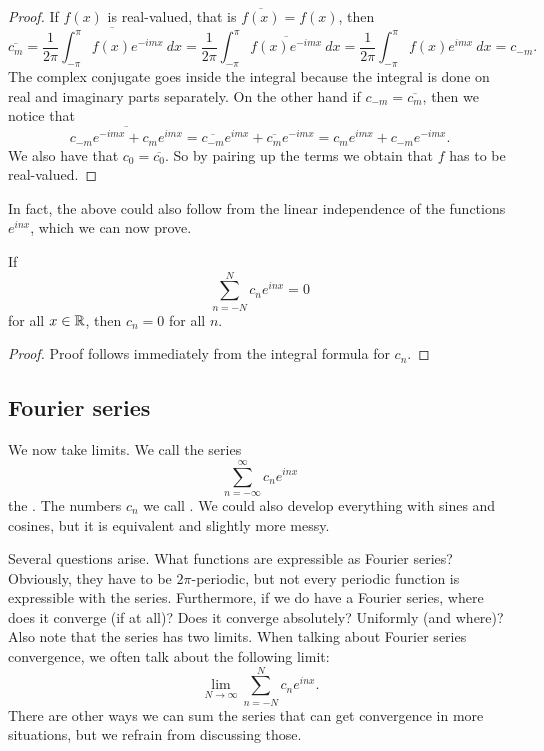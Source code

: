 \begin{proof}
If $f(x)$ is real-valued, that is $\overline{f(x)} = f(x)$, then
\begin{equation*}
\overline{c_m}
=
\overline{
\frac{1}{2\pi} \int_{-\pi}^\pi
f(x) e^{-imx} ~ dx
}
=
\frac{1}{2\pi} \int_{-\pi}^\pi
\overline{
f(x) e^{-imx} } ~ dx
=
\frac{1}{2\pi} \int_{-\pi}^\pi
f(x) e^{imx} ~ dx
= c_{-m} .
\end{equation*}
The complex conjugate goes inside the integral because the integral is
done on real and imaginary parts separately.  On the other hand if 
$c_{-m} = \overline{c_m}$, then we notice that
\begin{equation*}
\overline{c_{-m} e^{-imx}+ c_{m} e^{imx}}
=
\overline{c_{-m}} e^{imx}+ \overline{c_{m}} e^{-imx}
=
c_{m} e^{imx}+ c_{-m} e^{-imx} .
\end{equation*}
We also have that $c_0 = \overline{c_0}$.
So by pairing up the terms we obtain that $f$ has to be real-valued.
\end{proof}

In fact, the above could also follow from the linear independence of the
functions $e^{inx}$, which we can now prove.

\begin{prop}
If
\begin{equation*}
\sum_{n=-N}^N c_n e^{inx} = 0
\end{equation*}
for all $x \in {\mathbb{R}}$, then $c_n = 0$ for all $n$.
\end{prop}

\begin{proof}
Proof follows immediately from the integral formula for $c_n$.
\end{proof}

\subsection{Fourier series}

We now take limits.  We call the series
\begin{equation*}
\sum_{n=-\infty}^\infty c_n e^{inx}
\end{equation*}
the \emph{}.  The numbers $c_n$
we call \emph{}.  We could also develop everything with
sines and cosines, but it is equivalent and slightly more messy.

Several questions arise.  What functions are expressible as 
Fourier series?  Obviously, they have to be $2\pi$-periodic, but not every
periodic function is expressible with the series.  Furthermore, if we do have
a Fourier series, where does it converge (if at all)?  Does it converge
absolutely?  Uniformly (and where)?  Also note that the series has two
limits.  When talking about Fourier series convergence, we often
talk about the following limit:
\begin{equation*}
\lim_{N\to\infty} 
\sum_{n=-N}^N c_n e^{inx} .
\end{equation*}
There are other ways we can sum the series that can get convergence in more
situations, but we refrain from discussing those.

